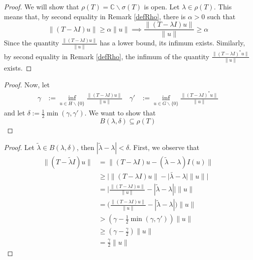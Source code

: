 \documentclass{beamer}
\begin{document}
  \begin{frame}{\subsecname}
    \begin{proof}
    We will show that $\rho(T)=\mathbb{C}\backslash\sigma(T)$ is open. Let $\lambda\in\rho(T)$. This means that, by second equality in Remark \ref{defRho}, there is $\alpha>0$ such that
    $$
    \lVert(T-\lambda I)u\rVert\geq\alpha\lVert u\rVert\implies\frac{\lVert(T-\lambda I)u\rVert}{\lVert u\rVert}\geq\alpha
    $$
    Since the quantity $\frac{\lVert(T-\lambda I)u\rVert}{\lVert u\rVert}$ has a lower bound, its infimum exists. Similarly, by second equality in Remark \ref{defRho}, the infimum of the quantity $\frac{\lVert(T-\lambda I)^{*}u\rVert}{\lVert u\rVert}$ exists.
  \end{proof}
  \end{frame}

  \begin{frame}{\subsecname}
    \begin{proof}
    Now, let
    $$
    \begin{aligned}
      \gamma&:=\inf_{u\in H\backslash\{0\}}\frac{\lVert(T-\lambda I)u\rVert}{\lVert u\rVert} \quad
      \gamma'&:=\inf_{u\in G\backslash\{0\}}\frac{\lVert(T-\lambda I)^{*}u\rVert}{\lVert u\rVert}
    \end{aligned}
    $$
    and let $\delta:=\frac{1}{2}\min(\gamma,\gamma')$. We want to show that
    $$
    B(\lambda,\delta)\subseteq\rho(T)
    $$
    \end{proof}
  \end{frame}

  \begin{frame}{\subsecname}
    \begin{proof}
      Let $\tilde{\lambda}\in B(\lambda,\delta)$, then $|\tilde{\lambda}-\lambda|<\delta$. First, we observe that
      $$
      \begin{aligned}
        \lVert(T-\tilde{\lambda}I)u\rVert&=\lVert(T-\lambda I)u-(\tilde{\lambda}-\lambda)I(u)\rVert\\&\geq|\lVert(T-\lambda I)u\rVert-|\bar{\lambda}-\lambda|\lVert u\rVert| \\
                                                                                                  &=\Big|\frac{\lVert(T-\lambda I)u\rVert}{\lVert u\rVert}-|\tilde{\lambda}-\lambda|\Big|\lVert u\rVert \\
                                                                                                  &=\Big(\frac{\lVert(T-\lambda I)u\rVert}{\lVert u\rVert}-|\tilde{\lambda}-\lambda|\Big)\lVert u\rVert \\
                                                                                                  &>(\gamma-\frac{1}{2}\min(\gamma,\gamma'))\lVert u\rVert \\
                                                                                                  &\geq(\gamma-\frac{\gamma}{2})\lVert u\rVert \\
                                                                                                  &=\frac{\gamma}{2}\lVert u\rVert
      \end{aligned}
      $$
    \end{proof}
  \end{frame}
\end{document}
